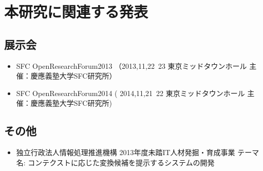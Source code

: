 \chapter{本研究に関連する発表}
\label{chap:publications}

\section{展示会}
\begin{itemize}
  \item SFC OpenResearchForum2013 （2013,11,22~23 東京ミッドタウンホール 主催：慶應義塾大学SFC研究所）
  \item SFC OpenResearchForum2014 ( 2014,11,21~22 東京ミッドタウンホール 主催：慶應義塾大学SFC研究所)
\end{itemize}

\section{その他}
\begin{itemize}
  \item 独立行政法人情報処理推進機構 2013年度未踏IT人材発掘・育成事業
        テーマ名: コンテクストに応じた変換候補を提示するシステムの開発
\end{itemize}
